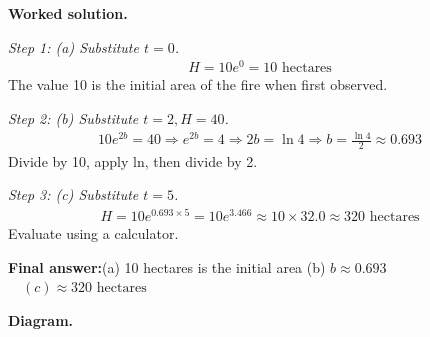 \documentclass[11pt]{article}
\begin{document}
\textbf{Worked solution.}

\textit{Step 1: (a) Substitute \( t = 0 \).}
\[\begin{gathered}
H = 10e^0 = 10 \text{ hectares}
\end{gathered}\]
The value 10 is the initial area of the fire when first observed.

\textit{Step 2: (b) Substitute \( t = 2, H = 40 \).}
\[\begin{gathered}
10e^{2b} = 40 \Rightarrow e^{2b} = 4 \Rightarrow 2b = \ln 4 \Rightarrow b = \frac{\ln 4}{2} \approx 0.693
\end{gathered}\]
Divide by 10, apply ln, then divide by 2.

\textit{Step 3: (c) Substitute \( t = 5 \).}
\[\begin{gathered}
H = 10e^{0.693 \times 5} = 10e^{3.466} \approx 10 \times 32.0 \approx 320 \text{ hectares}
\end{gathered}\]
Evaluate using a calculator.

\begin{answerbox}
\textbf{Final answer:}\quad (a) 10 hectares is the initial area \quad  (b) \(\displaystyle  b \approx 0.693 \)\(\displaystyle  \quad  (c) \approx 320 \text{ hectares}\)
\end{answerbox}
\textbf{Diagram.}
\end{document}
